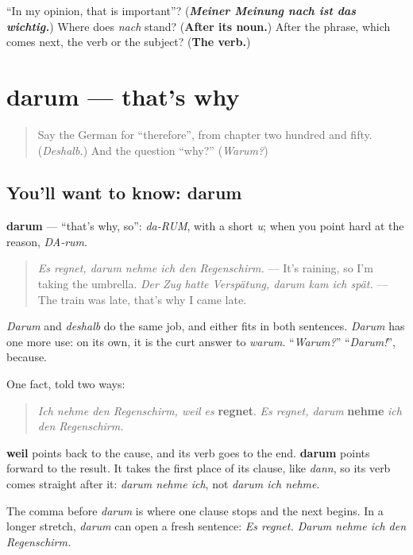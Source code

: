 \begin{tcolorbox}[breakable,colback=teal!4,colframe=teal!35!black,title={Before you move on}]
\textquotedblleft{}In my opinion, that is important\textquotedblright{}? (\emph{\textbf{Meiner Meinung nach ist das wichtig.}}) Where does \emph{nach} stand? (\textbf{After its noun.}) After the phrase, which comes next, the verb or the subject? (\textbf{The verb.})
\end{tcolorbox}
\section[darum]{darum — that's why}

\label{lesson:GE-C254-darum}



\begin{quote}
Say the German for \textquotedblleft{}therefore\textquotedblright{}, from chapter two hundred and fifty. (\emph{Deshalb.}) And the question \textquotedblleft{}why?\textquotedblright{} (\emph{Warum?})
\end{quote}

\subsection*{You'll want to know: darum}
\textbf{darum} — \textquotedblleft{}that's why, so\textquotedblright{}: \emph{da-RUM}, with a short \emph{u}; when you point hard at the reason, \emph{DA-rum}.

\begin{quote}
\emph{Es regnet, darum nehme ich den Regenschirm.} — It's raining, so I'm taking the umbrella. \emph{Der Zug hatte Verspätung, darum kam ich spät.} — The train was late, that's why I came late.
\end{quote}

\emph{Darum} and \emph{deshalb} do the same job, and either fits in both sentences. \emph{Darum} has one more use: on its own, it is the curt answer to \emph{warum}. \textquotedblleft{}\emph{Warum?}\textquotedblright{} \textquotedblleft{}\emph{Darum!}\textquotedblright{}, because.

\begin{grammarlens}[title={Grammar Lens: two directions, two word orders}]
One fact, told two ways:

\begin{quote}
\emph{Ich nehme den Regenschirm, weil es} \textbf{regnet}. \emph{Es regnet, darum} \textbf{nehme} \emph{ich den Regenschirm.}
\end{quote}

\textbf{weil} points back to the cause, and its verb goes to the end. \textbf{darum} points forward to the result. It takes the first place of its clause, like \emph{dann}, so its verb comes straight after it: \emph{darum nehme ich}, not \emph{darum ich nehme}.

The comma before \emph{darum} is where one clause stops and the next begins. In a longer stretch, \emph{darum} can open a fresh sentence: \emph{Es regnet. Darum nehme ich den Regenschirm.}
\end{grammarlens}


